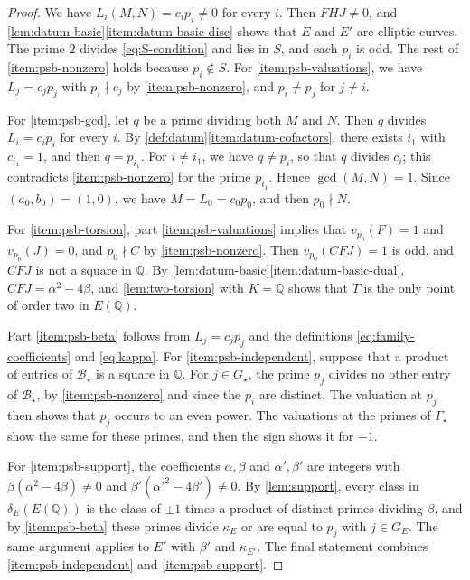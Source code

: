\documentclass[12pt,oneside,openany]{book}
\theoremstyle{definition}
\theoremstyle{plain}
\numberwithin{equation}{chapter}
\theoremstyle{plain}
\theoremstyle{definition}
\theoremstyle{remark}
\newcommand{\Q}{\mathbb Q}
\newcommand{\cB}{\mathcal B}
\begin{document}
\begin{proof}
We have $L_i(M,N)=c_ip_i\ne0$ for every $i$. Then $FHJ\ne0$, and \cref{lem:datum-basic}\ref{item:datum-basic-disc} shows that $E$ and $E'$ are elliptic curves. The prime $2$ divides \eqref{eq:S-condition} and lies in $S$, and each $p_i$ is odd. The rest of \ref{item:psb-nonzero} holds because $p_i\notin S$. For \ref{item:psb-valuations}, we have $L_j=c_jp_j$ with $p_{i}\nmid c_j$ by \ref{item:psb-nonzero}, and $p_i\ne p_j$ for $j\ne i$.

For \ref{item:psb-gcd}, let $q$ be a prime dividing both $M$ and $N$. Then $q$ divides $L_i=c_ip_i$ for every $i$. By \cref{def:datum}\ref{item:datum-cofactors}, there exists $i_1$ with $c_{i_1}=1$, and then $q=p_{i_1}$. For $i\ne i_1$, we have $q\ne p_i$, so that $q$ divides $c_i$; this contradicts \ref{item:psb-nonzero} for the prime $p_{i_1}$. Hence $\gcd(M,N)=1$. Since $(a_0,b_0)=(1,0)$, we have $M=L_0=c_0p_0$, and then $p_0\nmid N$.

For \ref{item:psb-torsion}, part \ref{item:psb-valuations} implies that $v_{p_0}(F)=1$ and $v_{p_0}(J)=0$, and $p_0\nmid C$ by \ref{item:psb-nonzero}. Then $v_{p_0}(CFJ)=1$ is odd, and $CFJ$ is not a square in $\Q$. By \cref{lem:datum-basic}\ref{item:datum-basic-dual}, $CFJ=\alpha^2-4\beta$, and \cref{lem:two-torsion} with $K=\Q$ shows that $T$ is the only point of order two in $E(\Q)$.

Part \ref{item:psb-beta} follows from $L_j=c_jp_j$ and the definitions \eqref{eq:family-coefficients} and \eqref{eq:kappa}. For \ref{item:psb-independent}, suppose that a product of entries of $\cB_\star$ is a square in $\Q$. For $j\in G_\star$, the prime $p_j$ divides no other entry of $\cB_\star$, by \ref{item:psb-nonzero} and since the $p_i$ are distinct. The valuation at $p_j$ then shows that $p_j$ occurs to an even power. The valuations at the primes of $\Gamma_\star$ show the same for these primes, and then the sign shows it for $-1$.

For \ref{item:psb-support}, the coefficients $\alpha,\beta$ and $\alpha',\beta'$ are integers with $\beta(\alpha^2-4\beta)\ne0$ and $\beta'(\alpha'^2-4\beta')\ne0$. By \cref{lem:support}, every class in $\delta_E(E(\Q))$ is the class of $\pm1$ times a product of distinct primes dividing $\beta$, and by \ref{item:psb-beta} these primes divide $\kappa_E$ or are equal to $p_j$ with $j\in G_E$. The same argument applies to $E'$ with $\beta'$ and $\kappa_{E'}$. The final statement combines \ref{item:psb-independent} and \ref{item:psb-support}.
\end{proof}
\end{document}

